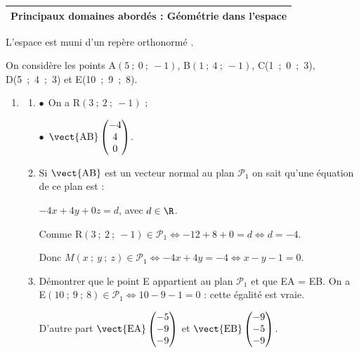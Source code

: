 
\medskip

\begin{tabularx}{\linewidth}{|X|}\hline
\textbf{Principaux domaines abordés :} Géométrie dans l'espace\\ \hline
\end{tabularx}

\medskip

L'espace est muni d'un repère orthonormé \Oijk.

On considère les points A$(5~;~0~;~-1)$, B$(1~;~4~;~-1)$, C(1~;~0~;~3), D(5~;~4~;~3) et E(10~;~9~;~8).

\medskip

\begin{enumerate}
\item 
	\begin{enumerate}
		\item %
		
$\bullet~~$On a R$(3~;~2~;~-1)$ ;

$\bullet~~$$\vect{\text{AB}}\begin{pmatrix}-4\\4\\0\end{pmatrix}$.
		\item %
Si $\vect{\text{AB}}$ est un vecteur normal au plan $\mathcal{P}_1$ on sait qu'une équation de ce plan est :

$-4x + 4y + 0z = d$, avec $d \in \R$.

Comme R$(3~;~2~;~-1) \in \mathcal{P}_1 \iff -12 + 8 + 0 = d \iff d = - 4$.

Donc $M(x~;~y~;~z) \in \mathcal{P}_1 \iff - 4x + 4y = -4 \iff x - y - 1 = 0$.
		\item Démontrer que le point E appartient au plan $\mathcal{P}_1$ et que EA = EB.
On a E$(10~;~9~;~8) \in \mathcal{P}_1 \iff 10 - 9 - 1 = 0$ : cette égalité est vraie.

D'autre part $\vect{\text{EA}}\begin{pmatrix}-5\\-9\\-9\end{pmatrix}$ et 
$\vect{\text{EB}}\begin{pmatrix}-9\\-5\\-9\end{pmatrix}$.


\end{enumerate}
\end{enumerate}
